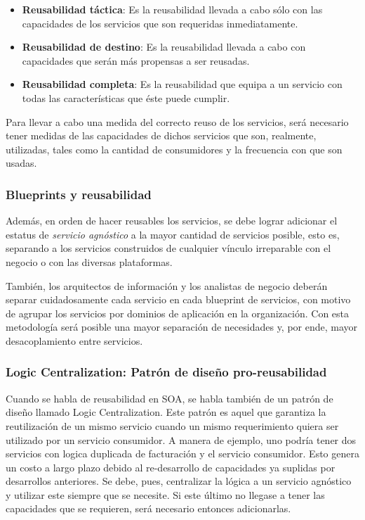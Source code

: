 \begin{itemize}
 \item \textbf{Reusabilidad táctica}: Es la reusabilidad llevada a cabo sólo con las capacidades de los servicios que son requeridas inmediatamente.
 \item \textbf{Reusabilidad de destino}: Es la reusabilidad llevada a cabo con capacidades que serán más propensas a ser reusadas.
 \item \textbf{Reusabilidad completa}: Es la reusabilidad que equipa a un servicio con todas las características que éste puede cumplir.
\end{itemize}

Para llevar a cabo una medida del correcto reuso de los servicios, será necesario tener medidas de las capacidades de dichos servicios que son, realmente, utilizadas, tales como la cantidad de consumidores y la frecuencia con que son usadas.

\subsubsection{Blueprints y reusabilidad}

Además, en orden de hacer reusables los servicios, se debe lograr adicionar el estatus de \textit{servicio agnóstico} a la mayor cantidad de servicios posible, esto es, separando a los servicios construidos de cualquier vínculo irreparable con el negocio o con las diversas plataformas.

También, los arquitectos de información y los analistas de negocio deberán separar cuidadosamente cada servicio en cada blueprint de servicios, con motivo de agrupar los servicios por dominios de aplicación en la organización. Con esta metodología será posible una mayor separación de necesidades y, por ende, mayor desacoplamiento entre servicios.

\subsubsection{Logic Centralization: Patrón de diseño pro-reusabilidad}

Cuando se habla de reusabilidad en SOA, se habla también de un patrón de diseño llamado Logic Centralization. Este patrón es aquel que garantiza la reutilización de un mismo servicio cuando un mismo requerimiento quiera ser utilizado por un servicio consumidor. A manera de ejemplo, uno podría tener dos servicios con logica duplicada de facturación y el servicio consumidor. Esto genera un costo a largo plazo debido al re-desarrollo de capacidades ya suplidas por desarrollos anteriores. Se debe, pues, centralizar la lógica a un servicio agnóstico y utilizar este siempre que se necesite. Si este último no llegase a tener las capacidades que se requieren, será necesario entonces adicionarlas.


